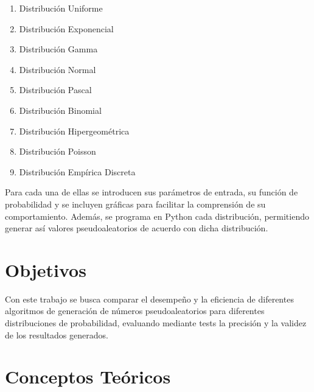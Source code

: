 \documentclass{article}
\begin{document}
\begin{enumerate}
    \item Distribución Uniforme
 
    \item Distribución Exponencial
 
    \item Distribución Gamma
 
    \item Distribución Normal
 
    \item Distribución Pascal
 
    \item Distribución Binomial
 
    \item Distribución Hipergeométrica
 
    \item Distribución Poisson
    
    \item Distribución Empírica Discreta
\end{enumerate}

 Para cada una de ellas se introducen sus parámetros de entrada, su función de probabilidad y se incluyen gráficas para facilitar la comprensión de su comportamiento. Además, se programa en Python cada distribución, permitiendo generar así valores pseudoaleatorios de acuerdo con dicha distribución.

\section{Objetivos}
 Con este trabajo se busca comparar el desempeño y la eficiencia de diferentes algoritmos de generación de números pseudoaleatorios para diferentes distribuciones de probabilidad, evaluando mediante tests la precisión y la validez de los resultados generados.

\section{Conceptos Teóricos}
\end{document}
